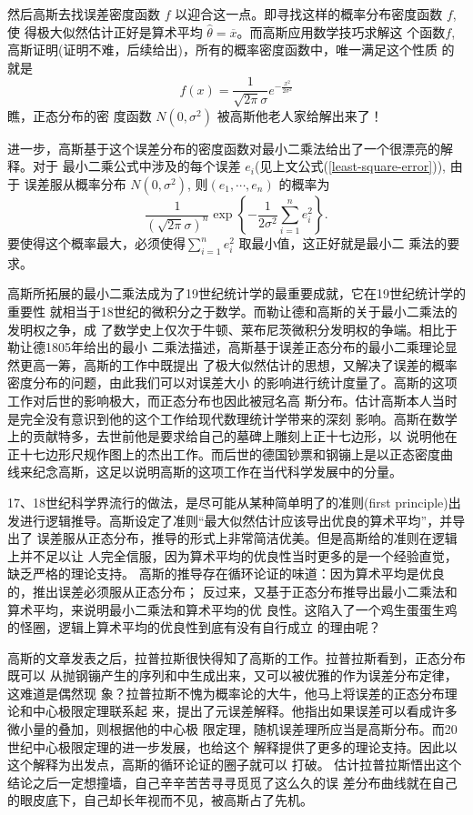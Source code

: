 然后高斯去找误差密度函数 $f$ 以迎合这一点。即寻找这样的概率分布密度函数 $f$, 使
得极大似然估计正好是算术平均 $\hat{\theta} = \overline{x}$。而高斯应用数学技巧求解这
个函数$f$, 高斯证明(证明不难，后续给出)，所有的概率密度函数中，唯一满足这个性质
的就是 $$ \displaystyle
f(x)=\frac{1}{\sqrt{2\pi}\sigma}e^{-\frac{x^2}{2\sigma^2}} $$ 瞧，正态分布的密
度函数 $N(0, \sigma^2)$ 被高斯他老人家给解出来了！

进一步，高斯基于这个误差分布的密度函数对最小二乘法给出了一个很漂亮的解释。对于
最小二乘公式中涉及的每个误差 $e_i$(见上文公式(\ref{least-square-error})), 由于
误差服从概率分布 $N(0, \sigma^2)$, 则$(e_1, \cdots, e_n)$ 的概率为
$$\frac{1}{(\sqrt{2\pi}\sigma)^n}\exp\left\{-\frac{1}{2\sigma^2} \sum_{i=1}^n e_i^2 \right\} .$$
要使得这个概率最大，必须使得$\sum_{i=1}^n e_i^2 $ 取最小值，这正好就是最小二
乘法的要求。

高斯所拓展的最小二乘法成为了19世纪统计学的最重要成就，它在19世纪统计学的重要性
就相当于18世纪的微积分之于数学。而勒让德和高斯的关于最小二乘法的发明权之争，成
了数学史上仅次于牛顿、莱布尼茨微积分发明权的争端。相比于勒让德1805年给出的最小
二乘法描述，高斯基于误差正态分布的最小二乘理论显然更高一筹，高斯的工作中既提出
了极大似然估计的思想，又解决了误差的概率密度分布的问题，由此我们可以对误差大小
的影响进行统计度量了。高斯的这项工作对后世的影响极大，而正态分布也因此被冠名高
斯分布。估计高斯本人当时是完全没有意识到他的这个工作给现代数理统计学带来的深刻
影响。高斯在数学上的贡献特多，去世前他是要求给自己的墓碑上雕刻上正十七边形，以
说明他在正十七边形尺规作图上的杰出工作。而后世的德国钞票和钢镚上是以正态密度曲
线来纪念高斯，这足以说明高斯的这项工作在当代科学发展中的分量。

17、18世纪科学界流行的做法，是尽可能从某种简单明了的准则(first principle)出
发进行逻辑推导。高斯设定了准则“最大似然估计应该导出优良的算术平均”，并导出了
误差服从正态分布，推导的形式上非常简洁优美。但是高斯给的准则在逻辑上并不足以让
人完全信服，因为算术平均的优良性当时更多的是一个经验直觉，缺乏严格的理论支持。
高斯的推导存在循环论证的味道：因为算术平均是优良的，推出误差必须服从正态分布；
反过来，又基于正态分布推导出最小二乘法和算术平均，来说明最小二乘法和算术平均的优
良性。这陷入了一个鸡生蛋蛋生鸡的怪圈，逻辑上算术平均的优良性到底有没有自行成立
的理由呢？

高斯的文章发表之后，拉普拉斯很快得知了高斯的工作。拉普拉斯看到，正态分布既可以
从抛钢镚产生的序列和中生成出来，又可以被优雅的作为误差分布定律，这难道是偶然现
象？拉普拉斯不愧为概率论的大牛，他马上将误差的正态分布理论和中心极限定理联系起
来，提出了元误差解释。他指出如果误差可以看成许多微小量的叠加，则根据他的中心极
限定理，随机误差理所应当是高斯分布。而20世纪中心极限定理的进一步发展，也给这个
解释提供了更多的理论支持。因此以这个解释为出发点，高斯的循环论证的圈子就可以
打破。 估计拉普拉斯悟出这个结论之后一定想撞墙，自己辛辛苦苦寻寻觅觅了这么久的误
差分布曲线就在自己的眼皮底下，自己却长年视而不见，被高斯占了先机。

